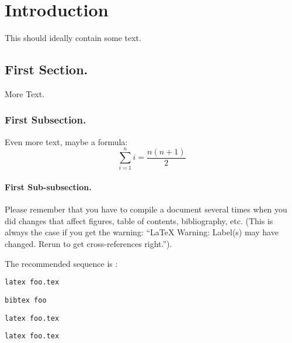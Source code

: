 \chapter{Introduction}
This should ideally contain some text.
\section{First Section.}
More Text.
\subsection[Alternative title for the Table of Contents]{First Subsection.}
Even more text, maybe a formula:
\begin{equation}
    \sum_{i=1}^{n}i=\frac{n(n+1)}{2}
\end{equation}
\subsubsection{First Sub-subsection.}

Please remember that you have to compile a document several times when
you did changes that affect figures, table of contents, bibliography,
etc. (This is always the case if you get the warning: ``LaTeX Warning:
Label(s) may have changed. Rerun to get cross-references right.'').

The recommended sequence is :

\texttt{latex foo.tex}

\texttt{bibtex foo}

\texttt{latex foo.tex}

\texttt{latex foo.tex}